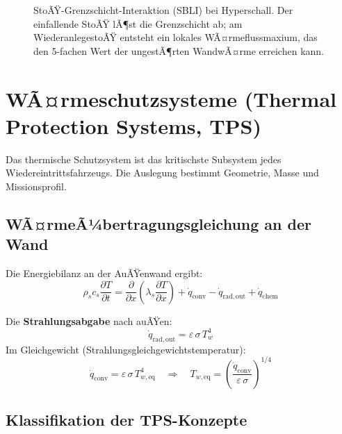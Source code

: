 ﻿\documentclass[12pt,a4paper]{article}
\begin{document}
\begin{figure}[H]
\caption{StoÃŸ-Grenzschicht-Interaktion (SBLI) bei Hyperschall. Der einfallende StoÃŸ
lÃ¶st die Grenzschicht ab; am WiederanlegestoÃŸ entsteht ein lokales WÃ¤rmeflussmaxium,
das den 5-fachen Wert der ungestÃ¶rten WandwÃ¤rme erreichen kann.}
\label{fig:sbli}
\end{figure}

\section{WÃ¤rmeschutzsysteme (Thermal Protection Systems, TPS)}

Das thermische Schutzsystem ist das kritischste Subsystem jedes Wiedereintrittsfahrzeugs.
Die Auslegung bestimmt Geometrie, Masse und Missionsprofil.

\subsection{WÃ¤rmeÃ¼bertragungsgleichung an der Wand}

Die Energiebilanz an der AuÃŸenwand ergibt:
\[
  \rho_s c_s \frac{\partial T}{\partial t}
    = \frac{\partial}{\partial x}\!\left(\lambda_s \frac{\partial T}{\partial x}\right)
    + \dot{q}_{\mathrm{conv}} - \dot{q}_{\mathrm{rad,out}} + \dot{q}_{\mathrm{chem}}
\]

Die \textbf{Strahlungsabgabe} nach auÃŸen:
\[
  \dot{q}_{\mathrm{rad,out}} = \varepsilon\,\sigma\,T_w^4
\]
Im Gleichgewicht (Strahlungsgleichgewichtstemperatur):
\[
  \dot{q}_{\mathrm{conv}} = \varepsilon\,\sigma\,T_{w,\mathrm{eq}}^4
  \quad\Rightarrow\quad
  T_{w,\mathrm{eq}} = \left(\frac{\dot{q}_{\mathrm{conv}}}{\varepsilon\,\sigma}\right)^{1/4}
\]

\subsection{Klassifikation der TPS-Konzepte}
\end{document}

